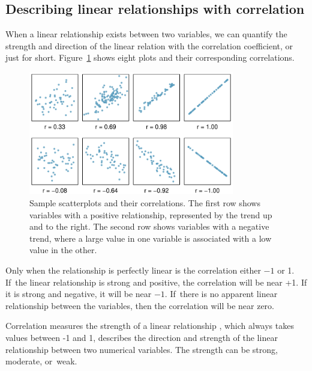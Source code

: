 \D{\newpage}

\subsection{Describing linear relationships with correlation}


When a linear relationship exists between two variables, we can quantify the strength and direction of the linear relation with the correlation coefficient, or just  for short.  Figure~\ref{posNegCorPlots} shows eight plots and their corresponding correlations. 

\begin{figure}[h]
   \centering
   \includegraphics[width=0.8\textwidth]{ch_regr_simple_linear/figures/posNegCorPlots/posNegCorPlots}
   \caption{Sample scatterplots and their correlations. The first row shows variables with a positive relationship, represented by the trend up and to the right. The second row shows variables with a negative trend, where a large value in one variable is associated with a low value in the other.}
   \label{posNegCorPlots}
\end{figure}

Only when the relationship is perfectly linear is the correlation either $-1$ or 1. If~the linear relationship is strong and positive, the correlation will be near +1. If it is strong and negative, it will be near $-1$. If~there is no apparent linear relationship between the variables, then the correlation will be near zero.


\begin{onebox}{Correlation measures the strength of a linear relationship}
, which always takes values between -1 and 1, describes the direction and strength of the linear relationship between two numerical variables. The strength can be strong, moderate, or~weak.\end{onebox}


